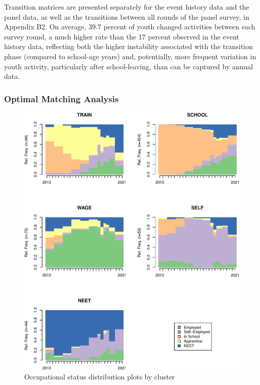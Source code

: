 \documentclass[
  a4paper, twoside, 12pt]{book}
\begin{document}
Transition matrices are presented separately for the event history data and the panel data, as well as the transitions between all rounds of the panel survey, in Appendix B2. On average, 39.7 percent of youth changed activities between each survey round, a much higher rate than the 17 percent observed in the event history data, reflecting both the higher instability associated with the transition phase (compared to school-age years) and, potentially, more frequent variation in youth activity, particularly after school-leaving, than can be captured by annual data.

\hypertarget{optimal-matching-analysis}{%
\subsubsection*{Optimal Matching Analysis}\label{optimal-matching-analysis}}

\begin{figure}[H]
\includegraphics{figures/fig-clusters-1} \caption{Occupational status distribution plots by cluster}\label{fig:fig-clusters}
\end{figure}
\end{document}
